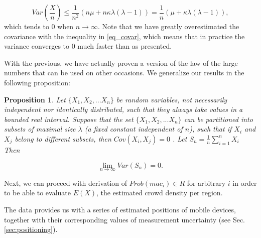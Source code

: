 \documentclass[10pt,a4paper]{article}
\newtheorem{proposition}{Proposition}[theorem]
\begin{document}
\begin{equation}
Var(\frac{X}{n} ) \leq \frac{1}{n^2}(n \mu + n  \kappa \lambda(\lambda - 1)) = \frac{1}{n}(\mu +  \kappa \lambda(\lambda - 1)), 
\end{equation}
which tends to $0$ when $n \rightarrow \infty$. Note that we have greatly overestimated the covariance with the inequality in \eqref{eq_covar}, which means that in practice the variance converges to $0$ much faster than as presented. 

With the previous, we have actually proven a version of the law of the large numbers that can be used on other occasions. We generalize our results in the following proposition:



\begin{proposition} Let $\{X_1, X_2, ... X_n\}$ be random variables, not necessarily independent nor identically distributed, such that they always take values in a bounded real interval. Suppose that the set  $\{X_1, X_2, ... X_n\}$ can be partitioned into subsets of maximal size $\lambda$  (a fixed constant independent of $n$), such that if $X_i$ and $X_j$ belong to different  subsets, then  $Cov(X_i,X_j) = 0$ . Let  $S_n = \frac{1}{n} \sum_{i=1}^{n} X_i$ Then 

$$ \lim_{n\to\infty} {Var(S_n)} = 0.$$ 
\end{proposition}

Next, we can proceed with derivation of $Prob(mac_i) \in R$ for arbitrary $i$ in order to be able to evaluate $E(X)$, the estimated crowd density per region. 
   

The data provides us with a series of estimated positions of mobile devices, together with their corresponding values of measurement uncertainty (see Sec.\ref{sec:positioning}).

\end{document}
